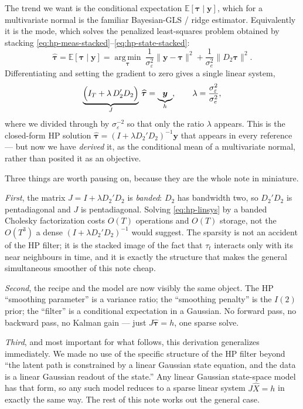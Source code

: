 \documentclass[11pt]{article}
\newcommand{\E}{\mathbb E}
\newcommand{\argmin}{\operatorname*{arg\,min}}
\begin{document}
The trend we want is the conditional expectation $\E[\bm\tau\mid\bm y]$,
which for a multivariate normal is the familiar Bayesian-GLS / ridge
estimator.  Equivalently it is the mode, which solves the
penalized least-squares problem obtained by stacking
\eqref{eq:hp-meas-stacked}--\eqref{eq:hp-state-stacked}:
\begin{equation}
\widehat{\bm\tau}
=\E[\bm\tau\mid\bm y]
=\argmin_{\bm\tau}\ \frac{1}{\sigma_\varepsilon^2}\|\bm y-\bm\tau\|^2
   + \frac{1}{\sigma_e^2}\|D_2\bm\tau\|^2 .
\label{eq:hp-pls-motiv}
\end{equation}
Differentiating and setting the gradient to zero gives a single linear
system,
\begin{equation}
\underbrace{\Bigl(I_T+\lambda\,D_2'D_2\Bigr)}_{J}\,\widehat{\bm\tau}
   = \underbrace{\bm y}_{h},
\qquad \lambda=\frac{\sigma_\varepsilon^2}{\sigma_e^2},
\label{eq:hp-linsys}
\end{equation}
where we divided through by $\sigma_\varepsilon^{-2}$ so that only the
ratio $\lambda$ appears.  This is the closed-form HP solution
$\widehat{\bm\tau}=(I+\lambda D_2'D_2)^{-1}\bm y$ that appears in every
reference --- but now we have \emph{derived} it, as the conditional mean
of a multivariate normal, rather than posited it as an objective.

Three things are worth pausing on, because they are the whole note in
miniature.

\emph{First}, the matrix $J=I+\lambda D_2'D_2$ is \emph{banded}: $D_2$
has bandwidth two, so $D_2'D_2$ is pentadiagonal and $J$ is pentadiagonal.
Solving \eqref{eq:hp-linsys} by a banded Cholesky factorization costs
$O(T)$ operations and $O(T)$ storage, not the $O(T^3)$ a dense
$(I+\lambda D_2'D_2)^{-1}$ would suggest.  The sparsity is not an
accident of the HP filter; it is the stacked image of the fact that
$\tau_t$ interacts only with its near neighbours in time, and it is
exactly the structure that makes the general simultaneous smoother of
this note cheap.

\emph{Second}, the recipe and the model are now visibly the same object.
The HP ``smoothing parameter'' is a variance ratio; the ``smoothing
penalty'' is the $I(2)$ prior; the ``filter'' is a conditional
expectation in a Gaussian.  No forward pass, no backward pass, no
Kalman gain --- just $J\widehat{\bm\tau}=h$, one sparse solve.

\emph{Third}, and most important for what follows, this derivation
generalizes immediately.  We made no use of the specific structure of
the HP filter beyond ``the latent path is constrained by a linear
Gaussian state equation, and the data is a linear Gaussian readout of
the state.''  Any linear Gaussian state-space model has that form, so
any such model reduces to a sparse linear system $J\widehat X=h$ in
exactly the same way.  The rest of this note works out the general
case.
\end{document}
